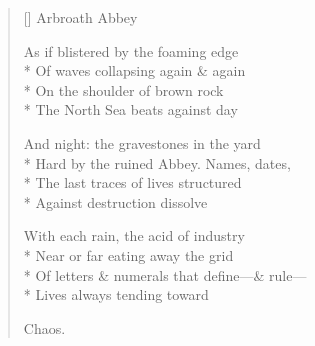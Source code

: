 \label{ch:chaos_theory}
\settowidth{\versewidth}{Of letters \& numerals that define---\& rule---}
\begin{verse}[\versewidth]
             Arbroath Abbey

As if blistered by the foaming edge\\*
Of waves collapsing again \& again\\*
On the shoulder of brown rock\\*
The North Sea beats against day

And night: the gravestones in the yard\\*
Hard by the ruined Abbey.  Names, dates,\\*
The last traces of lives structured\\*
Against destruction dissolve

With each rain, the acid of industry\\*
Near or far eating away the grid\\*
Of letters \& numerals that define---\& rule---\\*
Lives always tending toward

Chaos.
\end{verse}
